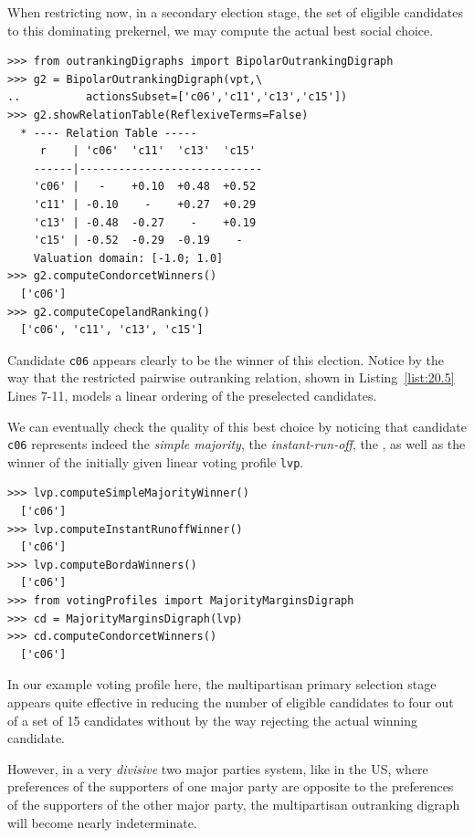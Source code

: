 
When restricting now, in a secondary election stage, the set of eligible candidates to this dominating prekernel, we may compute the actual best social choice.
\begin{lstlisting}[caption={Recommending the secondary election winner},label=list:20.5]
>>> from outrankingDigraphs import BipolarOutrankingDigraph
>>> g2 = BipolarOutrankingDigraph(vpt,\
..          actionsSubset=['c06','c11','c13','c15'])
>>> g2.showRelationTable(ReflexiveTerms=False)
  * ---- Relation Table -----
     r    | 'c06'  'c11'  'c13'  'c15'   
    ------|----------------------------
    'c06' |   -    +0.10  +0.48  +0.52  
    'c11' | -0.10    -    +0.27  +0.29  
    'c13' | -0.48  -0.27    -    +0.19  
    'c15' | -0.52  -0.29  -0.19    -   
    Valuation domain: [-1.0; 1.0]
>>> g2.computeCondorcetWinners()
  ['c06']
>>> g2.computeCopelandRanking()
  ['c06', 'c11', 'c13', 'c15']
\end{lstlisting}

Candidate \texttt{c06} appears clearly to be the winner of this election. Notice by the way that the restricted pairwise outranking relation, shown in Listing~\ref{list:20.5} Lines 7-11, models a linear ordering of the preselected candidates.

We can eventually check the quality of this best choice by noticing that candidate \texttt{c06} represents indeed the \emph{simple majority}, the \emph{instant-run-off}, the \Borda, as well as the \Condorcet winner of the initially given linear voting profile \texttt{lvp}.
\begin{lstlisting}
>>> lvp.computeSimpleMajorityWinner()
  ['c06']
>>> lvp.computeInstantRunoffWinner()
  ['c06']
>>> lvp.computeBordaWinners()
  ['c06']
>>> from votingProfiles import MajorityMarginsDigraph
>>> cd = MajorityMarginsDigraph(lvp)
>>> cd.computeCondorcetWinners()
  ['c06']
\end{lstlisting}

In our example voting profile here, the multipartisan primary selection stage appears quite effective in reducing the number of eligible candidates to four out of a set of 15 candidates without by the way rejecting the actual winning candidate.

However, in a very \emph{divisive} two major parties system, like in the US, where preferences of the supporters of one major party are opposite to the preferences of the supporters of the other major party, the multipartisan outranking digraph will become nearly indeterminate.

